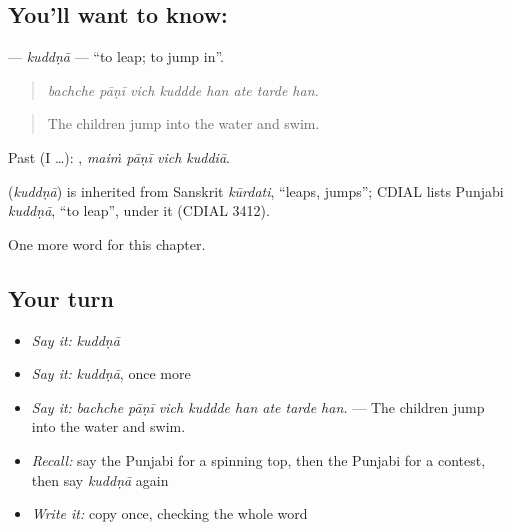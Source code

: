 \subsection*{You'll want to know: }
\textbf{} — \emph{kuddṇā} — \textquotedblleft{}to leap; to jump in\textquotedblright{}.

\begin{quote}
       
\end{quote}

\begin{quote}
\emph{bachche pāṇī vich kuddde han ate tarde han.}
\end{quote}

\begin{quote}
The children jump into the water and swim.
\end{quote}

Past (I …):    , \emph{maiṁ pāṇī vich kuddiā}.

\begin{cousinweb}
\textbf{} (\emph{kuddṇā}) is inherited from Sanskrit \emph{kūrdati}, \textquotedblleft{}leaps, jumps\textquotedblright{}; CDIAL lists Punjabi \emph{kuddṇā}, \textquotedblleft{}to leap\textquotedblright{}, under it (CDIAL 3412).
\end{cousinweb}

\begin{grammarlens}[title={What you've built}]
One more word for this chapter.
\end{grammarlens}

\subsection*{Your turn}
\begin{itemize}
\raggedright
  \item \emph{Say it:} \emph{kuddṇā}
  \item \emph{Say it:} \emph{kuddṇā}, once more
  \item \emph{Say it:} \emph{bachche pāṇī vich kuddde han ate tarde han.} — The children jump into the water and swim.
  \item \emph{Recall:} say the Punjabi for a spinning top, then the Punjabi for a contest, then say \emph{kuddṇā} again
  \item \emph{Write it:} copy \textbf{} once, checking the whole word
\end{itemize}

